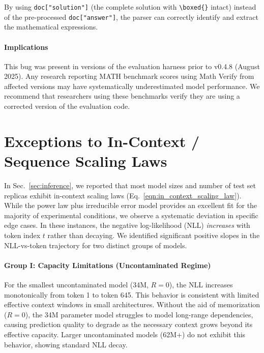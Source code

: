 By using \texttt{doc["solution"]} (the complete solution with \verb|\boxed{}| intact) instead of the pre-processed \texttt{doc["answer"]}, the parser can correctly identify and extract the mathematical expressions.

\paragraph{Implications}
This bug was present in versions of the evaluation harness prior to v0.4.8 (August 2025).
Any research reporting MATH benchmark scores using Math Verify from affected versions may have systematically underestimated model performance.
We recommend that researchers using these benchmarks verify they are using a corrected version of the evaluation code.

\clearpage

\section{Exceptions to In-Context / Sequence Scaling Laws}
\label{app:sec:exceptions_to_sequence_scaling_laws}


In Sec.~\ref{sec:inference}, we reported that most model sizes and number of test set replicas exhibit in-context scaling laws (Eq.~\ref{eqn:in_context_scaling_law}).
While the power law plus irreducible error model provides an excellent fit for the majority of experimental conditions, we observe a systematic deviation in specific edge cases.
In these instances, the negative log-likelihood (NLL) \textit{increases} with token index $t$ rather than decaying.
We identified significant positive slopes in the NLL-vs-token trajectory for two distinct groups of models.




\paragraph{Group I: Capacity Limitations (Uncontaminated Regime)}
For the smallest uncontaminated model (34M, $R=0$), the NLL increases monotonically from token 1 to token 645. This behavior is consistent with limited effective context windows in small architectures. Without the aid of memorization ($R=0$), the 34M parameter model struggles to model long-range dependencies, causing prediction quality to degrade as the necessary context grows beyond its effective capacity. Larger uncontaminated models (62M+) do not exhibit this behavior, showing standard NLL decay.

